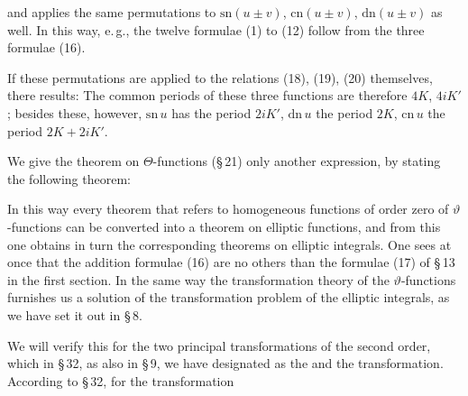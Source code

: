 and applies the same permutations to $\mathrm{sn}(u \pm v)$, $\mathrm{cn}(u \pm v)$, $\mathrm{dn}(u \pm v)$ as well. In this way, e.\,g., the twelve formulae (1) to (12) follow from the three formulae (16).

If these permutations are applied to the relations (18), (19), (20) themselves, there results:
The common periods of these three functions are therefore $4K$, $4iK'$; besides these, however, $\mathrm{sn}\,u$ has the period $2iK'$, $\mathrm{dn}\,u$ the period $2K$, $\mathrm{cn}\,u$ the period $2K + 2iK'$.

We give the theorem on $\Theta$-functions (\S\,21) only another expression, by stating the following theorem:


In this way every theorem that refers to homogeneous functions of order zero of $\vartheta$-functions can be converted into a theorem on elliptic functions, and from this one obtains in turn the corresponding theorems on elliptic integrals. One sees at once that the addition formulae (16) are no others than the formulae (17) of \S\,13 in the first section. In the same way the transformation theory of the $\vartheta$-functions furnishes us a solution of the  transformation problem of the elliptic integrals, as we have set it out in \S\,8.

We will verify this for the two principal transformations of the second order, which in \S\,32, as also in \S\,9, we have designated as the  and the  transformation. According to \S\,32, for the  transformation
